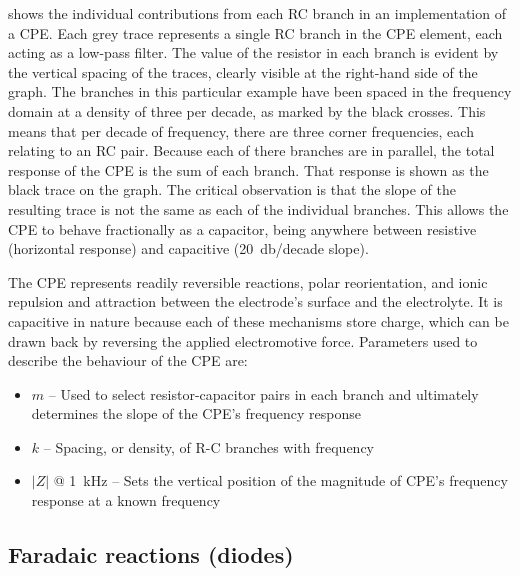      shows the individual contributions from each RC branch in an implementation of a CPE.
    Each grey trace represents a single RC branch in the CPE element, each acting as a low-pass filter.
    The value of the resistor in each branch is evident by the vertical spacing of the traces, clearly visible at the right-hand side of the graph.
    The branches in this particular example have been spaced in the frequency domain at a density of three per decade, as marked by the black crosses.
    This means that per decade of frequency, there are three corner frequencies, each relating to an RC pair.
    Because each of there branches are in parallel, the total response of the CPE is the sum of each branch.
    That response is shown as the black trace on the graph.
    The critical observation is that the slope of the resulting trace is not the same as each of the individual branches.
    This allows the CPE to behave fractionally as a capacitor, being anywhere between resistive (horizontal response) and capacitive (\SI{20}{\decibel}/decade slope).

    The CPE represents readily reversible reactions, polar reorientation, and ionic repulsion and attraction between the electrode's surface and the electrolyte.
    It is capacitive in nature because each of these mechanisms store charge, which can be drawn back by reversing the applied electromotive force.
    Parameters used to describe the behaviour of the CPE are:
    \begin{itemize}
      \item $m$ -- Used to select resistor-capacitor pairs in each branch and ultimately determines the slope of the CPE's frequency response
      \item $k$ -- Spacing, or density, of R-C branches with frequency
      \item $|Z|$ @ \SI{1}{\kilo\hertz} -- Sets the vertical position of the magnitude of CPE's frequency response at a known frequency
    \end{itemize}



  \subsection{Faradaic reactions (diodes)}


